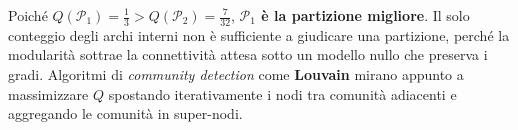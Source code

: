 Poich\'e $Q(\mathcal{P}_1) = \frac{1}{3} > Q(\mathcal{P}_2) = \frac{7}{32}$, \textbf{$\mathcal{P}_1$ \`e la partizione migliore}. Il solo conteggio degli archi interni non \`e sufficiente a giudicare una partizione, perch\'e la modularit\`a sottrae la connettivit\`a attesa sotto un modello nullo che preserva i gradi. Algoritmi di \textit{community detection} come \textbf{Louvain} mirano appunto a massimizzare $Q$ spostando iterativamente i nodi tra comunit\`a adiacenti e aggregando le comunit\`a in super-nodi.
